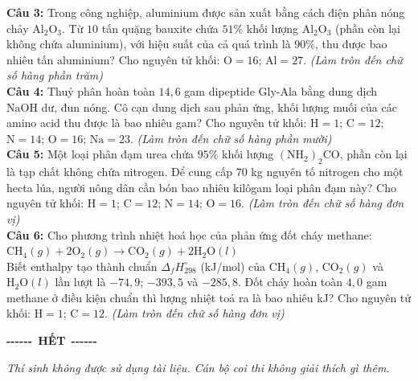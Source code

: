 \documentclass[12pt,a4paper]{article}
\begin{document}
\noindent \textbf{Câu 3:} Trong công nghiệp, aluminium được sản xuất bằng cách điện phân nóng chảy $\text{Al}_2\text{O}_3$. Từ $10$ tấn quặng bauxite chứa $51\%$ khối lượng $\text{Al}_2\text{O}_3$ (phần còn lại không chứa aluminium), với hiệu suất của cả quá trình là $90\%$, thu được bao nhiêu tấn aluminium? Cho nguyên tử khối: $\text{O} = 16$; $\text{Al} = 27$. \textit{(Làm tròn đến chữ số hàng phần trăm)}\\

\noindent \textbf{Câu 4:} Thuỷ phân hoàn toàn $14{,}6$ gam dipeptide Gly-Ala bằng dung dịch $\text{NaOH}$ dư, đun nóng. Cô cạn dung dịch sau phản ứng, khối lượng muối của các amino acid thu được là bao nhiêu gam? Cho nguyên tử khối: $\text{H} = 1$; $\text{C} = 12$; $\text{N} = 14$; $\text{O} = 16$; $\text{Na} = 23$. \textit{(Làm tròn đến chữ số hàng phần mười)}\\

\noindent \textbf{Câu 5:} Một loại phân đạm urea chứa $95\%$ khối lượng $(\text{NH}_2)_2\text{CO}$, phần còn lại là tạp chất không chứa nitrogen. Để cung cấp $70$ kg nguyên tố nitrogen cho một hecta lúa, người nông dân cần bón bao nhiêu kilôgam loại phân đạm này? Cho nguyên tử khối: $\text{H} = 1$; $\text{C} = 12$; $\text{N} = 14$; $\text{O} = 16$. \textit{(Làm tròn đến chữ số hàng đơn vị)}\\

\noindent \textbf{Câu 6:} Cho phương trình nhiệt hoá học của phản ứng đốt cháy methane:\\
$\text{CH}_4(g) + 2\text{O}_2(g) \longrightarrow \text{CO}_2(g) + 2\text{H}_2\text{O}(l)$\\
Biết enthalpy tạo thành chuẩn $\Delta_f H^{\circ}_{298}$ (kJ/mol) của $\text{CH}_4(g)$, $\text{CO}_2(g)$ và $\text{H}_2\text{O}(l)$ lần lượt là $-74{,}9$; $-393{,}5$ và $-285{,}8$. Đốt cháy hoàn toàn $4{,}0$ gam methane ở điều kiện chuẩn thì lượng nhiệt toả ra là bao nhiêu kJ? Cho nguyên tử khối: $\text{H} = 1$; $\text{C} = 12$. \textit{(Làm tròn đến chữ số hàng đơn vị)}\\\vspace{0.6cm}
\begin{center}
{\bfseries -{}-{}-{}-{}-{}-}\ \textbf{HẾT}\ {\bfseries -{}-{}-{}-{}-{}-}
\end{center}
\vspace{0.15cm}
{\small\itshape
Thí sinh không được sử dụng tài liệu. Cán bộ coi thi không giải thích gì thêm.}
\end{document}
